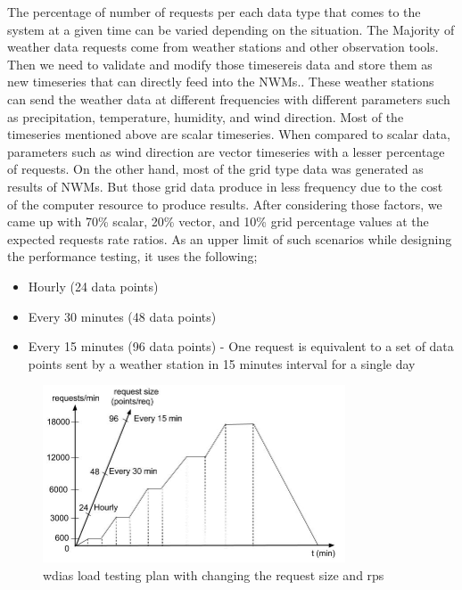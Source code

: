 The percentage of number of requests per each data type that comes to the system at a given time can be varied depending on the situation. The Majority of weather data requests come from weather stations and other observation tools. Then we need to validate and modify those timesereis data and store them as new timeseries that can directly feed into the NWMs.. These weather stations can send the weather data at different frequencies with different parameters such as precipitation, temperature, humidity, and wind direction. Most of the timeseries mentioned above are scalar timeseries. When compared to scalar data, parameters such as wind direction are vector timeseries with a lesser percentage of requests. On the other hand, most of the grid type data was generated as results of NWMs. But those grid data produce in less frequency due to the cost of the computer resource to produce results. After considering those factors, we came up with 70\% scalar, 20\% vector, and 10\% grid percentage values at the expected requests rate ratios.
As an upper limit of such scenarios while designing the performance testing, it uses the following;
\begin{itemize}
    \item Hourly (24 data points)
    \item Every 30 minutes (48 data points)
    \item Every 15 minutes (96 data points) - One request is equivalent to a set of data points sent by a weather station in 15 minutes interval for a single day
\end{itemize}

\begin{figure}[htp]
    \centering
    \includegraphics[width=0.8\textwidth]{results/work_load/performance_study_v4.jpg}
    \caption{\acrshort{wdias} load testing plan with changing the request size and \acrshort{rps}}
    \label{fi:performance_study_load}
\end{figure}

